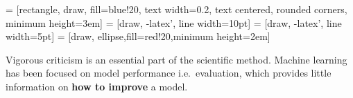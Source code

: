 \documentclass[landscape,a0b,final,a4resizeable]{a0poster}
\newenvironment{poster}{
  \begin{center}
  \begin{minipage}[c]{0.96\textwidth}
}{
  \end{minipage} 
  \end{center}
}
\begin{document}
\begin{poster}
\begin{multicols}{3}



\begin{center}
  \large
   = [rectangle, draw, fill=blue!20, 
                       text width=0.2\columnwidth, text centered, rounded corners, minimum height=3em]
   = [draw, -latex', line width=10pt]
   = [draw, -latex', line width=5pt]
   = [draw, ellipse,fill=red!20,minimum height=2em]
    
\end{center}


Vigorous criticism is an essential part of the scientific method.
Machine learning has been focused on model performance i.e.\ evaluation, which provides little information on \textbf{how to improve} a model.



\end{multicols}
\end{poster}
\end{document}
